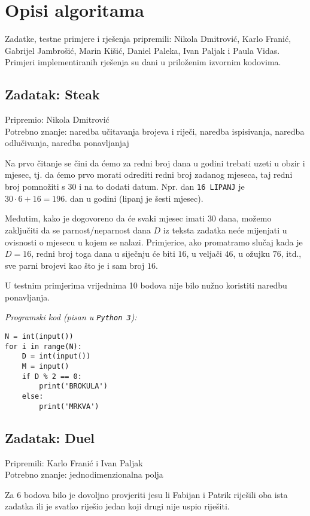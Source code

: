 \documentclass[a4paper]{article}
\begin{document}
\section*{Opisi algoritama}
Zadatke, testne primjere i rješenja pripremili: Nikola Dmitrović, Karlo Franić,
Gabrijel Jambrošić, Marin Kišić, Daniel Paleka, Ivan Paljak i Paula Vidas.
Primjeri implementiranih rješenja su dani u priloženim izvornim kodovima.

\subsection*{Zadatak: Steak}
\textsf{Pripremio: Nikola Dmitrović}\\
\textsf{Potrebno znanje: naredba učitavanja brojeva i riječi, naredba
ispisivanja, naredba odlučivanja, naredba ponavljanjaj}

Na prvo čitanje se čini da ćemo za redni broj dana u godini trebati uzeti u
obzir i mjesec, tj. da ćemo prvo morati odrediti redni broj zadanog mjeseca,
taj redni broj pomnožiti s $30$ i na to dodati datum. Npr. dan \texttt{16 LIPANJ}
je $30 \cdot 6 + 16 = 196$.
dan u godini (lipanj je šesti mjesec).

Međutim, kako je dogovoreno da će svaki mjesec imati $30$ dana, možemo
zaključiti da se parnost/neparnost dana $D$ iz teksta zadatka neće mijenjati u
ovisnosti o mjesecu u kojem se nalazi. Primjerice, ako promatramo slučaj kada
je $D=16$, redni broj toga dana u siječnju će biti $16$, u veljači $46$, u
ožujku $76$, itd., sve parni brojevi kao što je i sam broj $16$.

U testnim primjerima vrijednima 10 bodova nije bilo nužno koristiti naredbu ponavljanja.

\textit{Programski kod (pisan u \texttt{Python 3}):}

\vspace{-2ex}
\begin{verbatim}
N = int(input())
for i in range(N):
    D = int(input())
    M = input()
    if D % 2 == 0:
        print('BROKULA')
    else:
        print('MRKVA')
\end{verbatim}

\subsection*{Zadatak: Duel}
\textsf{Pripremili: Karlo Franić i Ivan Paljak}\\
\textsf{Potrebno znanje: jednodimenzionalna polja}

Za $6$ bodova bilo je dovoljno provjeriti jesu li Fabijan i Patrik riješili oba
ista zadatka ili je svatko riješio jedan koji drugi nije uspio riješiti.
\end{document}
